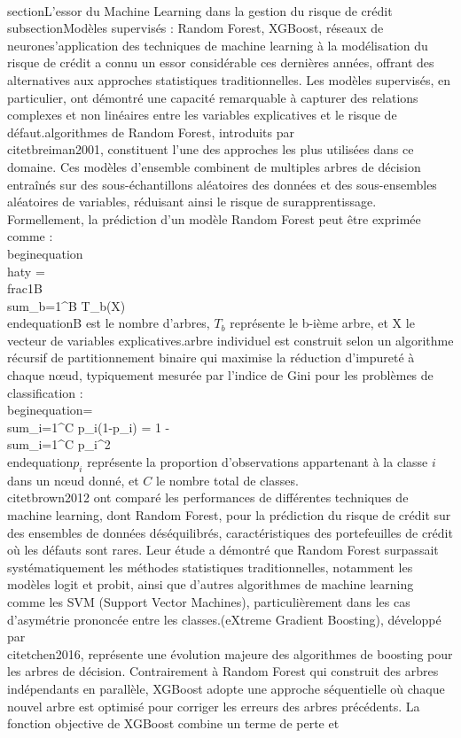 \\section{L'essor du Machine Learning dans la gestion du risque de crédit}\n\n\\subsection{Modèles supervisés : Random Forest, XGBoost, réseaux de neurones}\n\nL'application des techniques de machine learning à la modélisation du risque de crédit a connu un essor considérable ces dernières années, offrant des alternatives aux approches statistiques traditionnelles. Les modèles supervisés, en particulier, ont démontré une capacité remarquable à capturer des relations complexes et non linéaires entre les variables explicatives et le risque de défaut.\n\nLes algorithmes de Random Forest, introduits par \\citet{breiman2001}, constituent l'une des approches les plus utilisées dans ce domaine. Ces modèles d'ensemble combinent de multiples arbres de décision entraînés sur des sous-échantillons aléatoires des données et des sous-ensembles aléatoires de variables, réduisant ainsi le risque de surapprentissage. Formellement, la prédiction d'un modèle Random Forest peut être exprimée comme :\n\n\\begin{equation}\n\\hat{y} = \\frac{1}{B} \\sum_{b=1}^{B} T_b(X)\n\\end{equation}\n{} B est le nombre d'arbres, $T_b$ représente le b-ième arbre, et X le vecteur de variables explicatives.\n\nChaque arbre individuel est construit selon un algorithme récursif de partitionnement binaire qui maximise la réduction d'impureté à chaque nœud, typiquement mesurée par l'indice de Gini pour les problèmes de classification :\n\n\\begin{equation}\nG = \\sum_{i=1}^{C} p_i(1-p_i) = 1 - \\sum_{i=1}^{C} p_i^2\n\\end{equation}\n{} $p_i$ représente la proportion d'observations appartenant à la classe $i$ dans un nœud donné, et $C$ le nombre total de classes.\n\n\\citet{brown2012} ont comparé les performances de différentes techniques de machine learning, dont Random Forest, pour la prédiction du risque de crédit sur des ensembles de données déséquilibrés, caractéristiques des portefeuilles de crédit où les défauts sont rares. Leur étude a démontré que Random Forest surpassait systématiquement les méthodes statistiques traditionnelles, notamment les modèles logit et probit, ainsi que d'autres algorithmes de machine learning comme les SVM (Support Vector Machines), particulièrement dans les cas d'asymétrie prononcée entre les classes.\n\nXGBoost (eXtreme Gradient Boosting), développé par \\citet{chen2016}, représente une évolution majeure des algorithmes de boosting pour les arbres de décision. Contrairement à Random Forest qui construit des arbres indépendants en parallèle, XGBoost adopte une approche séquentielle où chaque nouvel arbre est optimisé pour corriger les erreurs des arbres précédents. La fonction objective de XGBoost combine un terme de perte et 